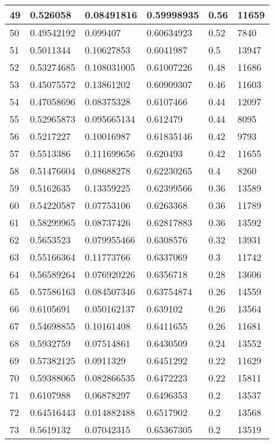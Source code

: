 \begin{longtable}{|l|l|l|l|l|l|}
49 & 0.526058 & 0.08491816 & 0.59998935 & 0.56 & 11659 \\ \hline 
50 & 0.49542192 & 0.099407 & 0.60634923 & 0.52 & 7840 \\ \hline 
51 & 0.5011344 & 0.10627853 & 0.6041987 & 0.5 & 13947 \\ \hline 
52 & 0.53274685 & 0.108031005 & 0.61007226 & 0.48 & 11686 \\ \hline 
53 & 0.45075572 & 0.13861202 & 0.60909307 & 0.46 & 11603 \\ \hline 
54 & 0.47058696 & 0.08375328 & 0.6107466 & 0.44 & 12097 \\ \hline 
55 & 0.52965873 & 0.095665134 & 0.612479 & 0.44 & 8095 \\ \hline 
56 & 0.5217227 & 0.10016987 & 0.61835146 & 0.42 & 9793 \\ \hline 
57 & 0.5513386 & 0.111699656 & 0.620493 & 0.42 & 11655 \\ \hline 
58 & 0.51476604 & 0.08688278 & 0.62230265 & 0.4 & 8260 \\ \hline 
59 & 0.5162635 & 0.13359225 & 0.62399566 & 0.36 & 13589 \\ \hline 
60 & 0.54220587 & 0.07753106 & 0.6263368 & 0.36 & 11789 \\ \hline 
61 & 0.58299965 & 0.08737426 & 0.62817883 & 0.36 & 13592 \\ \hline 
62 & 0.5653523 & 0.079955466 & 0.6308576 & 0.32 & 13931 \\ \hline 
63 & 0.55166364 & 0.11773766 & 0.6337069 & 0.3 & 11742 \\ \hline 
64 & 0.56589264 & 0.076920226 & 0.6356718 & 0.28 & 13606 \\ \hline 
65 & 0.57586163 & 0.084507346 & 0.63754874 & 0.26 & 14559 \\ \hline 
66 & 0.6105691 & 0.050162137 & 0.639102 & 0.26 & 13564 \\ \hline 
67 & 0.54698855 & 0.10161408 & 0.6411655 & 0.26 & 11681 \\ \hline 
68 & 0.5932759 & 0.07514861 & 0.6430509 & 0.24 & 13552 \\ \hline 
69 & 0.57382125 & 0.0911329 & 0.6451292 & 0.22 & 11629 \\ \hline 
70 & 0.59388065 & 0.082866535 & 0.6472223 & 0.22 & 15811 \\ \hline 
71 & 0.6107988 & 0.06878297 & 0.6496353 & 0.2 & 13537 \\ \hline 
72 & 0.64516443 & 0.014882488 & 0.6517902 & 0.2 & 13568 \\ \hline 
73 & 0.5619132 & 0.07042315 & 0.65367305 & 0.2 & 13519 \\ \hline 

\end{longtable}
